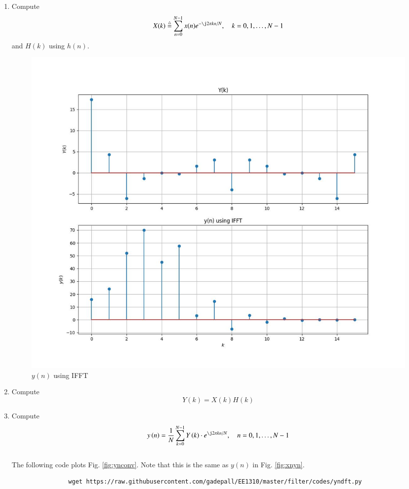 \documentclass[journal,12pt,twocolumn]{IEEEtran}
\renewcommand\thesection{\arabic{section}}
\begin{document}
		\begin{enumerate}[label=\thesection.\arabic*]
			\item
			Compute
			\begin{equation}
				X(k) \define \sum _{n=0}^{N-1}x(n) e^{-\j2\pi kn/N}, \quad k = 0,1,\dots, N-1
			\end{equation}
			and $H(k)$ using $h(n)$.
			\begin{figure}[!ht]
				\centering
				\includegraphics[width=\columnwidth]{./figs/e6.4-IFFT.jpg}
				\caption{$y(n)$ using IFFT}
				\label{fig:ifft}
			\end{figure}
			\item Compute 
			\begin{equation}
				Y(k) = X(k)H(k)
			\end{equation}
			\item Compute
			\begin{equation}
				y\brak{n}={\frac {1}{N}}\sum _{k=0}^{N-1}Y\brak{k}\cdot e^{\j 2\pi kn/N},\quad n = 0,1,\dots, N-1
			\end{equation}
			\\
			\solution The following code plots Fig. \ref{fig:ynconv}. Note that this is the same as 
			$y(n)$ in  Fig. 
			\ref{fig:xnyn}. 
			\begin{lstlisting}
				wget https://raw.githubusercontent.com/gadepall/EE1310/master/filter/codes/yndft.py
			\end{lstlisting}
			\begin{figure}[!ht]
				\centering

\end{figure}
\end{enumerate}
\end{document}
